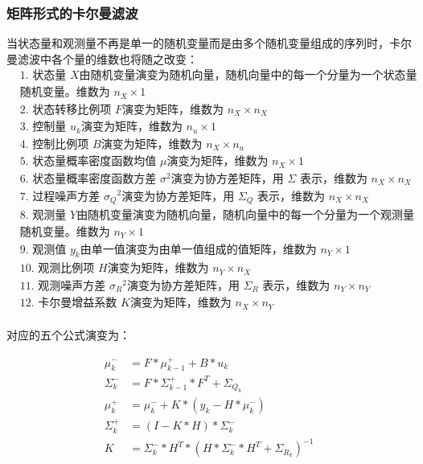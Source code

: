 \documentclass[12pt]{ctexart}
\begin{document}
\subsubsection{矩阵形式的卡尔曼滤波}
当状态量和观测量不再是单一的随机变量而是由多个随机变量组成的序列时，卡尔曼滤波中各个量的维数也将随之改变：
\[
    \begin{aligned}
    & \text{1. 状态量 } X  \text{由随机变量演变为随机向量，随机向量中的每一个分量为一个状态量} \\ 
    & \text{随机变量。维数为 } n_X \times 1 \\
    & \text{2. 状态转移比例项 } F  \text{演变为矩阵，维数为 } n_X \times n_X \\
    & \text{3. 控制量 } u_k  \text{演变为矩阵，维数为 } n_u \times 1 \\
    & \text{4. 控制比例项 } B  \text{演变为矩阵，维数为 } n_X \times n_u \\
    & \text{5. 状态量概率密度函数均值 } \mu  \text{演变为矩阵，维数为 } n_X \times 1 \\
    & \text{6. 状态量概率密度函数方差 } \sigma^2  \text{演变为协方差矩阵，用 } \Sigma \text{ 表示，维数为 } n_X \times n_X \\
    & \text{7. 过程噪声方差 } {\sigma_Q}^2  \text{演变为协方差矩阵，用 } \Sigma_Q \text{ 表示，维数为 } n_X \times n_X \\
    & \text{8. 观测量 } Y  \text{由随机变量演变为随机向量，随机向量中的每一个分量为一个观测量} \\
    & \text{随机变量。维数为 } n_Y \times 1 \\
    & \text{9. 观测值 } y_k  \text{由单一值演变为由单一值组成的值矩阵，维数为 } n_Y \times 1 \\
    & \text{10. 观测比例项 } H  \text{演变为矩阵，维数为 } n_Y \times n_X \\
    & \text{11. 观测噪声方差 } {\sigma_R}^2  \text{演变为协方差矩阵，用 } \Sigma_R \text{ 表示，维数为 } n_Y \times n_Y \\
    & \text{12. 卡尔曼增益系数 } K  \text{演变为矩阵，维数为 } n_X \times n_Y 
    \end{aligned}
\]  
~\\
        对应的五个公式演变为：
        
\begin{align}
    \mu_k^- &= F*\mu_{k-1}^++B*u_k \tag{4.1} \\
    \Sigma_k^- &= F*\Sigma_{k-1}^+*F^T+{\Sigma_{Q_k}} \tag{4.2} \\
    \mu_k^+ &= \mu_k^-+K*(y_k-H*\mu_k^-) \tag{4.3} \\
    \Sigma_k^+ &= (I-K*H)*\Sigma_k^- \tag{4.4} \\
    K &= \Sigma_k^-*H^T*(H*\Sigma_k^-*H^T+{\Sigma_{R_k}})^{-1} \tag{4.5}
\end{align}
        
\end{document}
